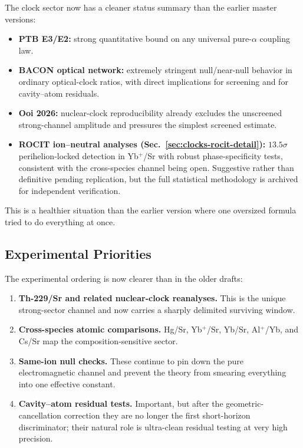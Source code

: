 The clock sector now has a cleaner status summary than the earlier master versions:
\begin{itemize}
\item \textbf{PTB E3/E2:} strong quantitative bound on any universal pure-$\alpha$ coupling law.
\item \textbf{BACON optical network:} extremely stringent null/near-null behavior in ordinary optical-clock ratios, with direct implications for screening and for cavity--atom residuals.
\item \textbf{Ooi 2026:} nuclear-clock reproducibility already excludes the unscreened strong-channel amplitude and pressures the simplest screened estimate.
\item \textbf{ROCIT ion--neutral analyses (Sec.~\ref{sec:clocks-rocit-detail}):} $13.5\sigma$ perihelion-locked detection in Yb$^+$/Sr with robust phase-specificity tests, consistent with the cross-species channel being open.  Suggestive rather than definitive pending replication, but the full statistical methodology is archived for independent verification.
\end{itemize}

This is a healthier situation than the earlier version where one oversized formula tried to do everything at once.

\subsection{Experimental Priorities}\label{sec:clocks-priorities}

The experimental ordering is now clearer than in the older drafts:
\begin{enumerate}
\item \textbf{Th-229/Sr and related nuclear-clock reanalyses.}  This is the unique strong-sector channel and now carries a sharply delimited surviving window.
\item \textbf{Cross-species atomic comparisons.}  Hg/Sr, Yb$^+$/Sr, Yb/Sr, Al$^+$/Yb, and Cs/Sr map the composition-sensitive sector.
\item \textbf{Same-ion null checks.}  These continue to pin down the pure electromagnetic channel and prevent the theory from smearing everything into one effective constant.
\item \textbf{Cavity--atom residual tests.}  Important, but after the geometric-cancellation correction they are no longer the first short-horizon discriminator; their natural role is ultra-clean residual testing at very high precision.
\end{enumerate}

